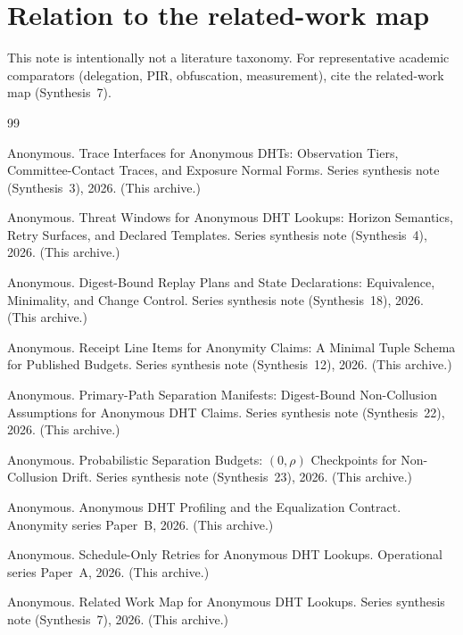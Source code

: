 \documentclass[11pt]{article}
\begin{document}
\section{Relation to the related-work map}
This note is intentionally not a literature taxonomy.
For representative academic comparators (delegation, PIR, obfuscation, measurement), cite the related-work map (Synthesis~7).\cite{series:relatedworkmap}

\begin{thebibliography}{99}\small

Anonymous.
\newblock Trace Interfaces for Anonymous DHTs: Observation Tiers, Committee-Contact Traces, and Exposure Normal Forms.
\newblock Series synthesis note (Synthesis~3), 2026. (This archive.)

Anonymous.
\newblock Threat Windows for Anonymous DHT Lookups: Horizon Semantics, Retry Surfaces, and Declared Templates.
\newblock Series synthesis note (Synthesis~4), 2026. (This archive.)

Anonymous.
\newblock Digest-Bound Replay Plans and State Declarations: Equivalence, Minimality, and Change Control.
\newblock Series synthesis note (Synthesis~18), 2026. (This archive.)

Anonymous.
\newblock Receipt Line Items for Anonymity Claims: A Minimal Tuple Schema for Published Budgets.
\newblock Series synthesis note (Synthesis~12), 2026. (This archive.)

Anonymous.
\newblock Primary-Path Separation Manifests: Digest-Bound Non-Collusion Assumptions for Anonymous DHT Claims.
\newblock Series synthesis note (Synthesis~22), 2026. (This archive.)

Anonymous.
\newblock Probabilistic Separation Budgets: $(0,\rho)$ Checkpoints for Non-Collusion Drift.
\newblock Series synthesis note (Synthesis~23), 2026. (This archive.)

Anonymous.
\newblock Anonymous DHT Profiling and the Equalization Contract.
\newblock Anonymity series Paper~B, 2026. (This archive.)

Anonymous.
\newblock Schedule-Only Retries for Anonymous DHT Lookups.
\newblock Operational series Paper~A, 2026. (This archive.)

Anonymous.
\newblock Related Work Map for Anonymous DHT Lookups.
\newblock Series synthesis note (Synthesis~7), 2026. (This archive.)



\end{thebibliography}
\end{document}
